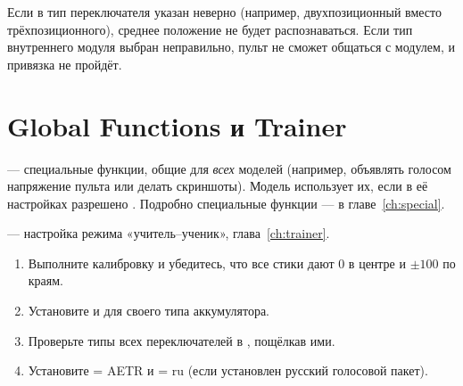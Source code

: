 \begin{caution}
Если в  тип переключателя указан неверно (например, двухпозиционный вместо
трёхпозиционного), среднее положение не будет распознаваться. Если тип внутреннего модуля
выбран неправильно, пульт не сможет общаться с модулем, и привязка не пройдёт.
\end{caution}

\section{Global Functions и Trainer}

 --- специальные функции, общие для \emph{всех} моделей
(например, объявлять голосом напряжение пульта или делать скриншоты). Модель использует их,
если в её настройках разрешено . Подробно специальные функции ---
в главе~\ref{ch:special}.

 --- настройка режима «учитель--ученик», глава~\ref{ch:trainer}.

\begin{tasks}
\begin{enumerate}
  \item Выполните калибровку и убедитесь, что все стики дают 0 в центре и $\pm100$ по краям.
  \item Установите  и  для своего типа аккумулятора.
  \item Проверьте типы всех переключателей в , пощёлкав ими.
  \item Установите  = AETR и  = ru
        (если установлен русский голосовой пакет).
\end{enumerate}
\end{tasks}
